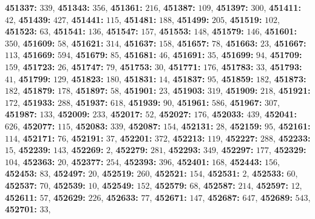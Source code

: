 \textsf{\bfseries 451337:} $339$, \textsf{\bfseries 451343:} $356$, \textsf{\bfseries 451361:} $216$, \textsf{\bfseries 451387:} $109$, \textsf{\bfseries 451397:} $300$, \textsf{\bfseries 451411:} $42$, \textsf{\bfseries 451439:} $427$, \textsf{\bfseries 451441:} $115$, \textsf{\bfseries 451481:} $188$, \textsf{\bfseries 451499:} $205$, \textsf{\bfseries 451519:} $102$, \textsf{\bfseries 451523:} $63$, \textsf{\bfseries 451541:} $136$, \textsf{\bfseries 451547:} $157$, \textsf{\bfseries 451553:} $148$, \textsf{\bfseries 451579:} $146$, \textsf{\bfseries 451601:} $350$, \textsf{\bfseries 451609:} $58$, \textsf{\bfseries 451621:} $314$, \textsf{\bfseries 451637:} $158$, \textsf{\bfseries 451657:} $78$, \textsf{\bfseries 451663:} $23$, \textsf{\bfseries 451667:} $113$, \textsf{\bfseries 451669:} $594$, \textsf{\bfseries 451679:} $85$, \textsf{\bfseries 451681:} $46$, \textsf{\bfseries 451691:} $35$, \textsf{\bfseries 451699:} $94$, \textsf{\bfseries 451709:} $159$, \textsf{\bfseries 451723:} $26$, \textsf{\bfseries 451747:} $79$, \textsf{\bfseries 451753:} $30$, \textsf{\bfseries 451771:} $176$, \textsf{\bfseries 451783:} $33$, \textsf{\bfseries 451793:} $41$, \textsf{\bfseries 451799:} $129$, \textsf{\bfseries 451823:} $180$, \textsf{\bfseries 451831:} $14$, \textsf{\bfseries 451837:} $95$, \textsf{\bfseries 451859:} $182$, \textsf{\bfseries 451873:} $182$, \textsf{\bfseries 451879:} $178$, \textsf{\bfseries 451897:} $58$, \textsf{\bfseries 451901:} $23$, \textsf{\bfseries 451903:} $319$, \textsf{\bfseries 451909:} $218$, \textsf{\bfseries 451921:} $172$, \textsf{\bfseries 451933:} $288$, \textsf{\bfseries 451937:} $618$, \textsf{\bfseries 451939:} $90$, \textsf{\bfseries 451961:} $586$, \textsf{\bfseries 451967:} $307$, \textsf{\bfseries 451987:} $133$, \textsf{\bfseries 452009:} $233$, \textsf{\bfseries 452017:} $52$, \textsf{\bfseries 452027:} $176$, \textsf{\bfseries 452033:} $439$, \textsf{\bfseries 452041:} $626$, \textsf{\bfseries 452077:} $115$, \textsf{\bfseries 452083:} $339$, \textsf{\bfseries 452087:} $154$, \textsf{\bfseries 452131:} $28$, \textsf{\bfseries 452159:} $95$, \textsf{\bfseries 452161:} $114$, \textsf{\bfseries 452171:} $76$, \textsf{\bfseries 452191:} $37$, \textsf{\bfseries 452201:} $372$, \textsf{\bfseries 452213:} $119$, \textsf{\bfseries 452227:} $288$, \textsf{\bfseries 452233:} $15$, \textsf{\bfseries 452239:} $143$, \textsf{\bfseries 452269:} $2$, \textsf{\bfseries 452279:} $281$, \textsf{\bfseries 452293:} $349$, \textsf{\bfseries 452297:} $177$, \textsf{\bfseries 452329:} $104$, \textsf{\bfseries 452363:} $20$, \textsf{\bfseries 452377:} $254$, \textsf{\bfseries 452393:} $396$, \textsf{\bfseries 452401:} $168$, \textsf{\bfseries 452443:} $156$, \textsf{\bfseries 452453:} $83$, \textsf{\bfseries 452497:} $20$, \textsf{\bfseries 452519:} $260$, \textsf{\bfseries 452521:} $154$, \textsf{\bfseries 452531:} $2$, \textsf{\bfseries 452533:} $60$, \textsf{\bfseries 452537:} $70$, \textsf{\bfseries 452539:} $10$, \textsf{\bfseries 452549:} $152$, \textsf{\bfseries 452579:} $68$, \textsf{\bfseries 452587:} $214$, \textsf{\bfseries 452597:} $12$, \textsf{\bfseries 452611:} $57$, \textsf{\bfseries 452629:} $226$, \textsf{\bfseries 452633:} $77$, \textsf{\bfseries 452671:} $147$, \textsf{\bfseries 452687:} $647$, \textsf{\bfseries 452689:} $543$, \textsf{\bfseries 452701:} $33$, 
